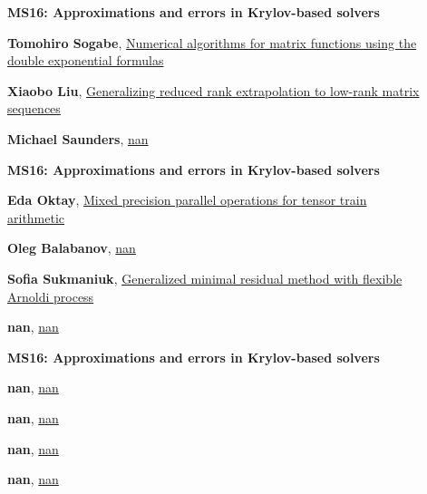 \documentclass[ILAS2025-program.tex]{subfiles}
\begin{document}
        \begin{description}
    \item[] {\color{mstitle}\textbf{MS16: Approximations and errors in Krylov-based solvers}} 
    \item[] \hypertarget{up0301}{}\textbf{Tomohiro Sogabe}, \hyperlink{down0301}{Numerical algorithms for matrix functions using the double exponential formulas
}
        \item[] \hypertarget{up0302}{}\textbf{Xiaobo Liu}, \hyperlink{down0302}{Generalizing reduced rank extrapolation to low-rank matrix sequences
}
        \item[] \hypertarget{up0303}{}\textbf{Michael Saunders}, \hyperlink{down0303}{nan}
        \end{description}
    \begin{description}
    \item[] {\color{mstitle}\textbf{MS16: Approximations and errors in Krylov-based solvers}} 
    \item[] \hypertarget{up0343}{}\textbf{Eda Oktay}, \hyperlink{down0343}{Mixed precision parallel operations for tensor train arithmetic}
        \item[] \hypertarget{up0344}{}\textbf{Oleg Balabanov}, \hyperlink{down0344}{nan}
        \item[] \hypertarget{up0345}{}\textbf{Sofia Sukmaniuk}, \hyperlink{down0345}{Generalized minimal residual method with flexible Arnoldi process}
        \item[] \hypertarget{up0346}{}\textbf{nan}, \hyperlink{down0346}{nan}
        \end{description}
    \begin{description}
    \item[] {\color{mstitle}\textbf{MS16: Approximations and errors in Krylov-based solvers}} 
    \item[] \hypertarget{up0387}{}\textbf{nan}, \hyperlink{down0387}{nan}
        \item[] \hypertarget{up0388}{}\textbf{nan}, \hyperlink{down0388}{nan}
        \item[] \hypertarget{up0389}{}\textbf{nan}, \hyperlink{down0389}{nan}
        \item[] \hypertarget{up0390}{}\textbf{nan}, \hyperlink{down0390}{nan}
        \end{description}
    \newpage
\end{document}
